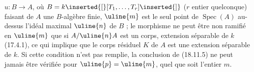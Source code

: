 $u:B\longrightarrow A$, où $B=k\inserted{[}[T_1,\ldots,T_r]\inserted{]}$ ($r$ entier quelconque) faisant de $A$ une $B$-algèbre finie, $\uline{m}$ est le seul point de $\operatorname{Spec}(A)$ au-dessus  l'idéal maximal  $\uline{n}$ de $B$ ;  le morphisme  ne peut être non ramifié en $\uline{m}$ que si $A/\uline{n}A$ est un corps, extension séparable de $k$ (17.4.1), ce qui implique que le corps résiduel $K$ de $A$ est une extension séparable de $k$. Si cette condition n'est pas remplie, la conclusion de (18.11.5) ne peut jamais être vérifiée pour $\uline{p}=\uline{m}$, quel que soit l'entier $m$.

